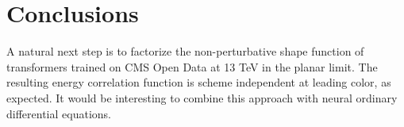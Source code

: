 \section{Conclusions}\label{sec:conclusions}

A natural next step is to factorize the non-perturbative shape function
of transformers trained on CMS Open Data at 13 TeV in the planar limit.
The resulting energy correlation function is scheme independent at
leading color, as expected. It would be interesting to combine this
approach with neural ordinary differential equations.

